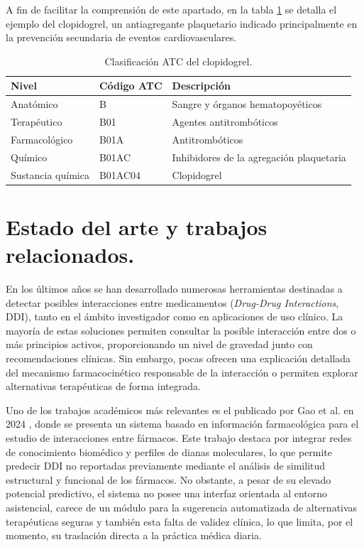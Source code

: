 A fin de facilitar la comprensión de este apartado, en la tabla \ref{tab:ATC_clopidogrel} se detalla el ejemplo del clopidogrel, un antiagregante plaquetario indicado principalmente en la prevención secundaria de eventos cardiovasculares.

\begin{table}[hbtp!]
\centering
\caption{Clasificación ATC del clopidogrel.}
\label{tab:ATC_clopidogrel}
\begin{tabular}{lll}
\toprule
\textbf{Nivel} & \textbf{Código ATC} & \textbf{Descripción} \\
\midrule
Anatómico & B & Sangre y órganos hematopoyéticos \\
Terapéutico & B01 & Agentes antitrombóticos \\
Farmacológico & B01A & Antitrombóticos \\
Químico & B01AC & Inhibidores de la agregación plaquetaria \\
Sustancia química & B01AC04 & Clopidogrel \\
\bottomrule
\end{tabular}
\end{table}

\section{Estado del arte y trabajos relacionados.}

En los últimos años se han desarrollado numerosas herramientas destinadas a detectar posibles interacciones entre medicamentos (\textit{Drug-Drug Interactions}, DDI), tanto en el ámbito investigador como en aplicaciones de uso clínico. La mayoría de estas soluciones permiten consultar la posible interacción entre dos o más principios activos, proporcionando un nivel de gravedad junto con recomendaciones clínicas. Sin embargo, pocas ofrecen una explicación detallada del mecanismo farmacocinético responsable de la interacción o permiten explorar alternativas terapéuticas de forma integrada.

Uno de los trabajos académicos más relevantes es el publicado por Gao et al. en 2024 \cite{pubmed_39180399}, donde se presenta un sistema basado en información farmacológica para el estudio de interacciones entre fármacos. Este trabajo destaca por integrar redes de conocimiento biomédico y perfiles de dianas moleculares, lo que permite predecir DDI no reportadas previamente mediante el análisis de similitud estructural y funcional de los fármacos. No obstante, a pesar de su elevado potencial predictivo, el sistema no posee una interfaz orientada al entorno asistencial, carece de un módulo para la sugerencia automatizada de alternativas terapéuticas seguras y también esta falta de validez clínica, lo que limita, por el momento, su traslación directa a la práctica médica diaria.

